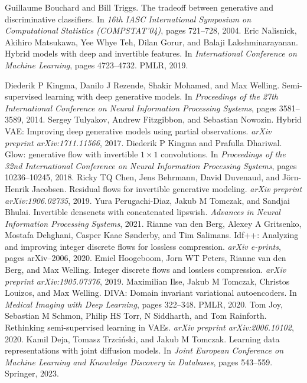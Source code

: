 \begin{chapterreferences}
 Guillaume Bouchard and Bill Triggs. The tradeoff between generative and discriminative classifiers. In \emph{16th IASC International Symposium on Computational Statistics (COMPSTAT’04)}, pages 721--728, 2004.
 Eric Nalisnick, Akihiro Matsukawa, Yee Whye Teh, Dilan Gorur, and Balaji Lakshminarayanan. Hybrid models with deep and invertible features. In \emph{International Conference on Machine Learning}, pages 4723--4732. PMLR, 2019.

 Diederik P Kingma, Danilo J Rezende, Shakir Mohamed, and Max Welling. Semi-supervised learning with deep generative models. In \emph{Proceedings of the 27th International Conference on Neural Information Processing Systems}, pages 3581--3589, 2014.
 Sergey Tulyakov, Andrew Fitzgibbon, and Sebastian Nowozin. Hybrid VAE: Improving deep generative models using partial observations. \emph{arXiv preprint arXiv:1711.11566}, 2017.
 Diederik P Kingma and Prafulla Dhariwal. Glow: generative flow with invertible $1\times1$ convolutions. In \emph{Proceedings of the 32nd International Conference on Neural Information Processing Systems}, pages 10236--10245, 2018.
 Ricky TQ Chen, Jens Behrmann, David Duvenaud, and Jörn-Henrik Jacobsen. Residual flows for invertible generative modeling. \emph{arXiv preprint arXiv:1906.02735}, 2019.
 Yura Perugachi-Diaz, Jakub M Tomczak, and Sandjai Bhulai. Invertible densenets with concatenated lipswish. \emph{Advances in Neural Information Processing Systems}, 2021.
 Rianne van den Berg, Alexey A Gritsenko, Mostafa Dehghani, Casper Kaae Sønderby, and Tim Salimans. Idf++: Analyzing and improving integer discrete flows for lossless compression. \emph{arXiv e-prints}, pages arXiv--2006, 2020.
 Emiel Hoogeboom, Jorn WT Peters, Rianne van den Berg, and Max Welling. Integer discrete flows and lossless compression. \emph{arXiv preprint arXiv:1905.07376}, 2019.
 Maximilian Ilse, Jakub M Tomczak, Christos Louizos, and Max Welling. DIVA: Domain invariant variational autoencoders. In \emph{Medical Imaging with Deep Learning}, pages 322--348. PMLR, 2020.
 Tom Joy, Sebastian M Schmon, Philip HS Torr, N Siddharth, and Tom Rainforth. Rethinking semi-supervised learning in VAEs. \emph{arXiv preprint arXiv:2006.10102}, 2020.
 Kamil Deja, Tomasz Trzciński, and Jakub M Tomczak. Learning data representations with joint diffusion models. In \emph{Joint European Conference on Machine Learning and Knowledge Discovery in Databases}, pages 543--559. Springer, 2023.
\end{chapterreferences}

